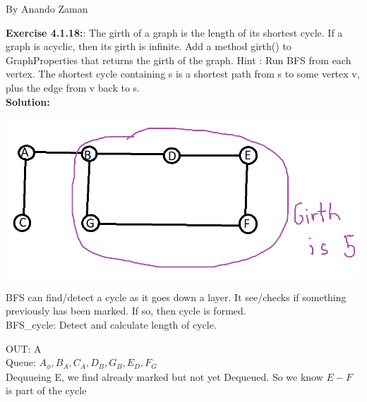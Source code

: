 \documentclass[11pt,fleqn]{article}
\begin{document}
By Anando Zaman

\textbf{Exercise 4.1.18:}: The girth of a graph is the length of its shortest cycle. If a graph is acyclic, then its
girth is infinite. Add a method girth() to GraphProperties that returns the girth of
the graph. Hint : Run BFS from each vertex. The shortest cycle containing s is a shortest
path from s to some vertex v, plus the edge from v back to s.\\

\textbf{Solution:}\\
\begin{center}
	\includegraphics[scale=0.7]{4.1.18.png}
\end{center}
BFS can find/detect a cycle as it goes down a layer. It see/checks if something previously has been marked. If so, then cycle is formed.\\

BFS\_cycle: Detect and calculate length of cycle.

OUT: A\\
Queue: $A_\phi,B_A,C_A,D_B,G_B,E_D,F_G$\\
Dequueing E, we find already marked but not yet Dequeued. So we know $E-F$ is part of the cycle



	
\end{document}
